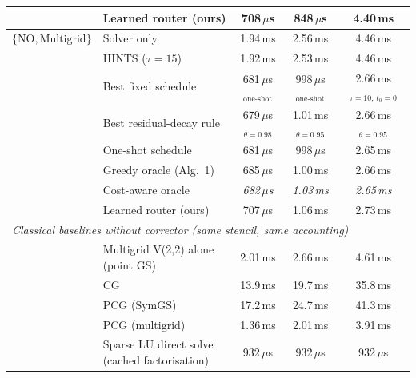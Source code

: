 {\begin{tabular}{llccc}
 & Learned router (ours) & 708\,$\mu$s & 848\,$\mu$s & 4.40\,ms \\
\midrule
$\{\mathrm{NO}, \text{Multigrid}\}$ & Solver only & 1.94\,ms & 2.56\,ms & 4.46\,ms \\
 & HINTS ($\tau{=}15$) & 1.92\,ms & 2.53\,ms & 4.46\,ms \\
 & Best fixed schedule & 681\,$\mu$s$_{\text{one-shot}}$ & 998\,$\mu$s$_{\text{one-shot}}$ & 2.66\,ms$_{\tau{=}10,\,t_0{=}0}$ \\
 & Best residual-decay rule & 679\,$\mu$s$_{\theta{=}0.98}$ & 1.01\,ms$_{\theta{=}0.95}$ & 2.66\,ms$_{\theta{=}0.95}$ \\
 & One-shot schedule & 681\,$\mu$s & 998\,$\mu$s & 2.65\,ms \\
 & Greedy oracle (Alg.~1) & 685\,$\mu$s & 1.00\,ms & 2.66\,ms \\
 & Cost-aware oracle & \textit{682\,$\mu$s} & \textit{1.03\,ms} & \textit{2.65\,ms} \\
 & Learned router (ours) & 707\,$\mu$s & 1.06\,ms & 2.73\,ms \\
\midrule
\multicolumn{5}{l}{\emph{Classical baselines without corrector (same stencil, same accounting)}} \\ \midrule
 & Multigrid V(2,2) alone (point GS) & 2.01\,ms & 2.66\,ms & 4.61\,ms \\
 & CG & 13.9\,ms & 19.7\,ms & 35.8\,ms \\
 & PCG (SymGS) & 17.2\,ms & 24.7\,ms & 41.3\,ms \\
 & PCG (multigrid) & 1.36\,ms & 2.01\,ms & 3.91\,ms \\
 & Sparse LU direct solve (cached factorisation) & 932\,$\mu$s & 932\,$\mu$s & 932\,$\mu$s \\
\bottomrule
\end{tabular}}

